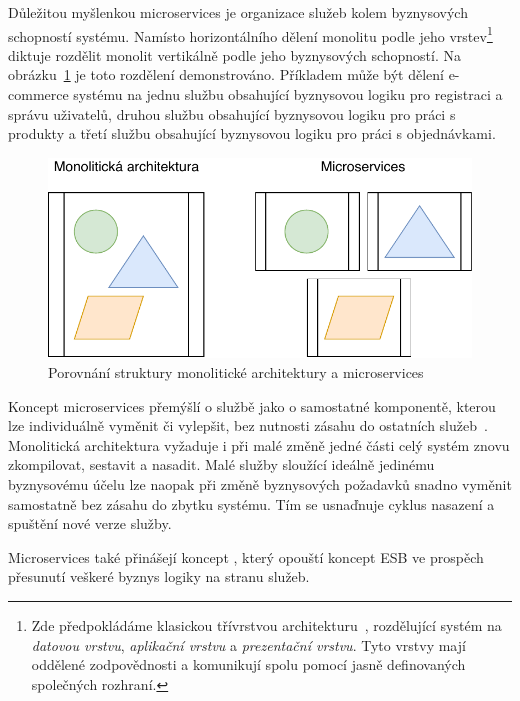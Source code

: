 Důležitou myšlenkou microservices je organizace služeb kolem
byznysových schopností systému. Namísto horizontálního dělení monolitu
podle jeho vrstev\footnote{
Zde předpokládáme klasickou třívrstvou architekturu~\cite{fowler2002patterns},
rozdělující systém na \textit{datovou vrstvu}, \textit{aplikační vrstvu}
a \textit{prezentační vrstvu}. Tyto vrstvy mají oddělené zodpovědnosti a komunikují
spolu pomocí jasně definovaných společných rozhraní.

} diktuje rozdělit monolit vertikálně podle jeho byznysových schopností.
Na obrázku~\ref{fig:monolith-vs-microservices} je toto rozdělení demonstrováno.
Příkladem může být dělení e-commerce systému na jednu službu obsahující byznysovou
logiku pro registraci a správu uživatelů, druhou službu obsahující byznysovou logiku
pro práci s produkty a třetí službu obsahující byznysovou logiku pro práci
s objednávkami.

\begin{figure}
    \centering
    \includegraphics[keepaspectratio=true, width=0.8\linewidth]{figures/monolith-vs-microservices.pdf}
    \caption{Porovnání struktury monolitické architektury a microservices}
    \label{fig:monolith-vs-microservices}
\end{figure}

Koncept microservices přemýšlí o službě jako o samostatné komponentě,
kterou lze individuálně vyměnit či vylepšit, bez nutnosti zásahu do
ostatních služeb~\cite{lewis2014microservices}. Monolitická architektura
vyžaduje i při malé změně jedné části celý systém znovu zkompilovat, sestavit
a nasadit. Malé služby sloužící ideálně jedinému byznysovému účelu lze naopak
při změně byznysových požadavků snadno vyměnit samostatně bez zásahu do zbytku
systému. Tím se usnaďnuje cyklus nasazení a spuštění nové verze služby.

Microservices také přinášejí koncept ,
který opouští koncept ESB ve prospěch přesunutí veškeré byznys logiky
na stranu služeb.

